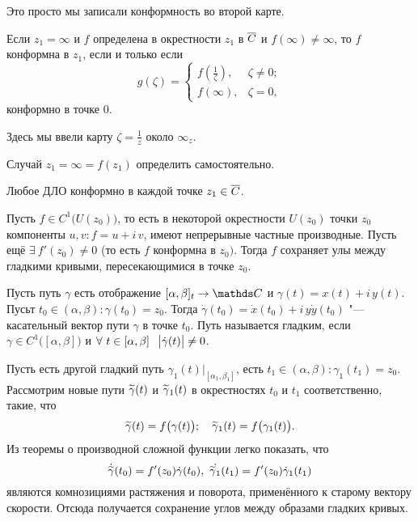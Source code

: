 Это просто мы записали конформность во второй карте.
\begin{Def}
	Если $z_1 = \infty$ и $f$ определена в окрестности $z_1$ в $\overline{C}$ и $f(\infty)\ne\infty$, то $f$ конформна в $z_1$, если и только если
	\[
		g(\zeta) = \begin{cases}
			f\left(\frac1\zeta\right),&\zeta\ne0;\\
			f(\infty),&\zeta=0,
		\end{cases}
	\]
	конформно в точке $0$.
\end{Def}
Здесь мы ввели карту $\zeta = \frac1z$ около $\infty_z$.

\begin{Task}
	Случай $z_1 = \infty = f(z_1)$ определить самостоятельно.
\end{Task}
\begin{Ut}
	Любое ДЛО конформно в каждой точке $z_1\in\overline{C}$.
\end{Ut}
\begin{Zam}
	Пусть $f\in C^1\big(U(z_0)\big)$, то есть в некоторой окрестности $U(z_0)$ точки $z_0$ компоненты $u,v\colon f = u+i\,v$, имеют непрерывные частные производные. Пусть ещё $\exists\ f'(z_0)\ne 0$ (то есть $f$ конформна в $z_0)$. Тогда $f$ сохраняет улы между гладкими кривыми, пересекающимися в точке $z_0$.
\end{Zam}
\begin{Def}
	Пусть путь $\gamma$ есть отображение $[\alpha,\beta]_t\to\C$ и $\gamma(t) = x(t)+i\, y(t)$. Пусьт $t_0\in(\alpha,\beta)\colon \gamma(t_0) = z_0$. Тогда $\dot\gamma(t_0) = \dot x(t_0) + i\, y\dot y(t_0)$ "--- касательный вектор пути $\gamma$ в точке $t_0$. Путь называется гладким, если $\gamma\in C^1\big([\alpha,\beta])$ и $\forall\ t\in[\alpha,\beta]\hskip .75em plus.1em minus.08em\relax \big|\dot\gamma(t)\big|\ne0$.
\end{Def}

Пусть есть другой гладкий путь $\gamma_1(t)\big|_{[\alpha_1,\beta_1]}$, есть $t_1\in(\alpha,\beta)\colon \gamma_1(t_1) = z_0$. Рассмотрим новые пути $\widetilde{\gamma}{}(t)$ и $\widetilde{\gamma}{}_1(t)$ в окрестностях $t_0$ и $t_1$ соответственно, такие, что
\[
	\widetilde{\gamma}{}(t) = f\big(\gamma(t)\big);\quad \widetilde{\gamma}{}_1(t) = f\big(\gamma_1(t)\big).
\]
Из теоремы о производной сложной функции легко показать, что 
\[
	\dot{\widetilde{\gamma}{}}(t_0) = f'(z_0)\dot\gamma(t_0),\ \dot{\widetilde{\gamma}{}_1}(t_1) = f'(z_0)\dot\gamma_1(t_1)
\]
являются комнозициями растяжения и поворота, применённого к старому вектору скорости. Отсюда получается сохранение углов между образами гладких кривых.

